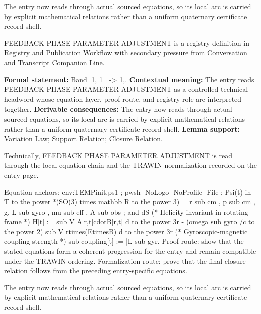The entry now reads through actual sourced equations, so its local arc is carried by explicit mathematical relations rather than a uniform quaternary certificate record shell.
\clearpage


\begingroup\small
{}
FEEDBACK PHASE PARAMETER ADJUSTMENT is a registry definition in Registry and Publication Workflow with secondary pressure from Conversation and Transcript Companion Line.

\begingroup\footnotesize\setlength{\emergencystretch}{3em}\sloppy
\textbf{Formal statement:} Band[ 1, 1 ] -> 1,. \textbf{Contextual meaning:} The entry reads FEEDBACK PHASE PARAMETER ADJUSTMENT as a controlled technical headword whose equation layer, proof route, and registry role are interpreted together. \textbf{Derivable consequences:} The entry now reads through actual sourced equations, so its local arc is carried by explicit mathematical relations rather than a uniform quaternary certificate record shell. \textbf{Lemma support:} Variation Law; Support Relation; Closure Relation.\par
\endgroup

Technically, FEEDBACK PHASE PARAMETER ADJUSTMENT is read through the local equation chain and the TRAWIN normalization recorded on the entry page.

Equation anchors: env:TEMPinit.ps1 ; pwsh -NoLogo -NoProfile -File ; Psi(t) in T to the power *(SO(3) times mathbb R to the power 3) = r sub cm , p sub cm , g, L sub gyro , mu sub eff , A sub obs ; and dS (* Helicity invariant in rotating frame *) H[t] :=   sub V A[r,t]cdotB[r,t] d to the power 3r - (omega sub gyro /c to the power 2)   sub V rtimes(EtimesB) d to the power 3r (* Gyroscopic-magnetic coupling strength *)   sub coupling[t] := |L sub gyr. Proof route: show that the stated equations form a coherent progression for the entry and remain compatible under the TRAWIN ordering. Formalization route: prove that the final closure relation follows from the preceding entry-specific equations.

The entry now reads through actual sourced equations, so its local arc is carried by explicit mathematical relations rather than a uniform quaternary certificate record shell.
\endgroup

